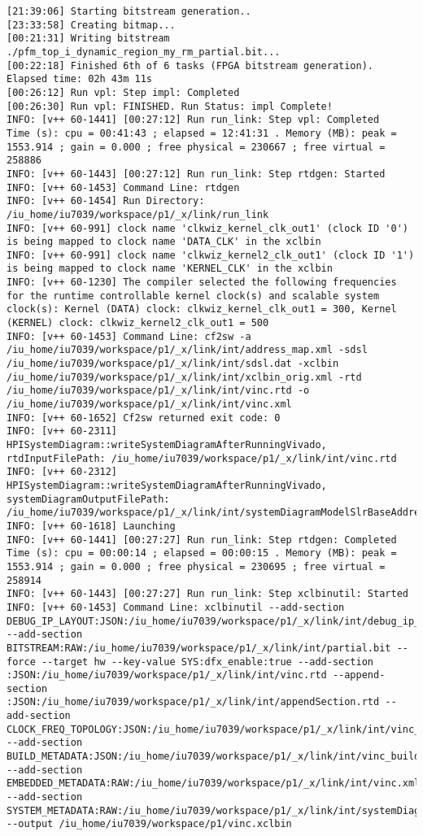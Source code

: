 \begin{lstlisting}[label=lst:lev_rec,caption=Содержимое log-файла]
[21:39:06] Starting bitstream generation..
[23:33:58] Creating bitmap...
[00:21:31] Writing bitstream ./pfm_top_i_dynamic_region_my_rm_partial.bit...
[00:22:18] Finished 6th of 6 tasks (FPGA bitstream generation). Elapsed time: 02h 43m 11s 
[00:26:12] Run vpl: Step impl: Completed
[00:26:30] Run vpl: FINISHED. Run Status: impl Complete!
INFO: [v++ 60-1441] [00:27:12] Run run_link: Step vpl: Completed
Time (s): cpu = 00:41:43 ; elapsed = 12:41:31 . Memory (MB): peak = 1553.914 ; gain = 0.000 ; free physical = 230667 ; free virtual = 258886
INFO: [v++ 60-1443] [00:27:12] Run run_link: Step rtdgen: Started
INFO: [v++ 60-1453] Command Line: rtdgen
INFO: [v++ 60-1454] Run Directory: /iu_home/iu7039/workspace/p1/_x/link/run_link
INFO: [v++ 60-991] clock name 'clkwiz_kernel_clk_out1' (clock ID '0') is being mapped to clock name 'DATA_CLK' in the xclbin
INFO: [v++ 60-991] clock name 'clkwiz_kernel2_clk_out1' (clock ID '1') is being mapped to clock name 'KERNEL_CLK' in the xclbin
INFO: [v++ 60-1230] The compiler selected the following frequencies for the runtime controllable kernel clock(s) and scalable system clock(s): Kernel (DATA) clock: clkwiz_kernel_clk_out1 = 300, Kernel (KERNEL) clock: clkwiz_kernel2_clk_out1 = 500
INFO: [v++ 60-1453] Command Line: cf2sw -a /iu_home/iu7039/workspace/p1/_x/link/int/address_map.xml -sdsl /iu_home/iu7039/workspace/p1/_x/link/int/sdsl.dat -xclbin /iu_home/iu7039/workspace/p1/_x/link/int/xclbin_orig.xml -rtd /iu_home/iu7039/workspace/p1/_x/link/int/vinc.rtd -o /iu_home/iu7039/workspace/p1/_x/link/int/vinc.xml
INFO: [v++ 60-1652] Cf2sw returned exit code: 0
INFO: [v++ 60-2311] HPISystemDiagram::writeSystemDiagramAfterRunningVivado, rtdInputFilePath: /iu_home/iu7039/workspace/p1/_x/link/int/vinc.rtd
INFO: [v++ 60-2312] HPISystemDiagram::writeSystemDiagramAfterRunningVivado, systemDiagramOutputFilePath: /iu_home/iu7039/workspace/p1/_x/link/int/systemDiagramModelSlrBaseAddress.json
INFO: [v++ 60-1618] Launching 
INFO: [v++ 60-1441] [00:27:27] Run run_link: Step rtdgen: Completed
Time (s): cpu = 00:00:14 ; elapsed = 00:00:15 . Memory (MB): peak = 1553.914 ; gain = 0.000 ; free physical = 230695 ; free virtual = 258914
INFO: [v++ 60-1443] [00:27:27] Run run_link: Step xclbinutil: Started
INFO: [v++ 60-1453] Command Line: xclbinutil --add-section DEBUG_IP_LAYOUT:JSON:/iu_home/iu7039/workspace/p1/_x/link/int/debug_ip_layout.rtd --add-section BITSTREAM:RAW:/iu_home/iu7039/workspace/p1/_x/link/int/partial.bit --force --target hw --key-value SYS:dfx_enable:true --add-section :JSON:/iu_home/iu7039/workspace/p1/_x/link/int/vinc.rtd --append-section :JSON:/iu_home/iu7039/workspace/p1/_x/link/int/appendSection.rtd --add-section CLOCK_FREQ_TOPOLOGY:JSON:/iu_home/iu7039/workspace/p1/_x/link/int/vinc_xml.rtd --add-section BUILD_METADATA:JSON:/iu_home/iu7039/workspace/p1/_x/link/int/vinc_build.rtd --add-section EMBEDDED_METADATA:RAW:/iu_home/iu7039/workspace/p1/_x/link/int/vinc.xml --add-section SYSTEM_METADATA:RAW:/iu_home/iu7039/workspace/p1/_x/link/int/systemDiagramModelSlrBaseAddress.json --output /iu_home/iu7039/workspace/p1/vinc.xclbin

\end{lstlisting}
